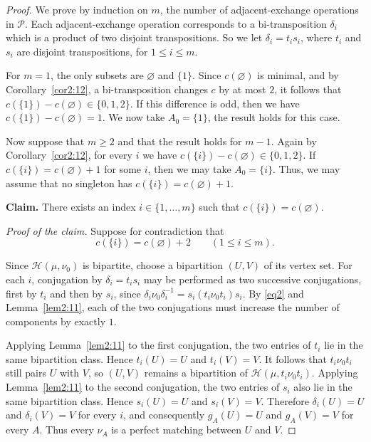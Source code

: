 \documentclass[12pt]{article}
\theoremstyle{definition}
\begin{document}
\begin{proof}
We prove by induction on $m$, the number of adjacent-exchange operations in $\mathcal P$.
Each adjacent-exchange operation corresponds to
a bi-transposition $\delta_i$ which is a product of two disjoint transpositions.
So we let $\delta_i=t_is_i$, where $t_i$ and $s_i$ are disjoint transpositions, for $1\leq i\leq m$.


For $m=1$, the only subsets are $\varnothing$ and $\{1\}$. Since $c(\varnothing)$ is minimal, and by Corollary~\ref{cor2:12}, a bi-transposition changes $c$ by at most $2$, it follows that $c(\{1\})-c(\varnothing)\in\{0,1,2\}$. If this difference is odd, then we have $c(\{1\})-c(\varnothing)=1$. We now take $A_0=\{1\}$, the result holds for this case.

Now suppose that $m\geq2$ and that the result holds for $m-1.$
Again by
Corollary~\ref{cor2:12}, for every $i$ we have
$c(\{i\})-c(\varnothing)\in\{0,1,2\}$.
If $c(\{i\})=c(\varnothing)+1$ for some $i$, then we may take
$A_0=\{i\}$. Thus, we may assume that no singleton has $c(\{i\})=c(\varnothing)+1$.

\medskip
\noindent\textbf{Claim.}
There exists an index $i\in\{1,\ldots,m\}$ such that
$c(\{i\})=c(\varnothing)$.

\smallskip
\noindent\textit{Proof of the claim.}
Suppose for contradiction that
\begin{equation}
c(\{i\})=c(\varnothing)+2
\qquad (1\leq i\leq m).
\label{eq2}
\end{equation}

Since $\mathcal H(\mu,\nu_0)$ is bipartite, choose a bipartition
$(U,V)$ of its vertex set. For each $i$, conjugation by
$\delta_i=t_is_i$ may be performed as two successive conjugations,
first by $t_i$ and then by $s_i$, since
$\delta_i\nu_0\delta_i^{-1}=s_i(t_i\nu_0t_i)s_i$.
By \eqref{eq2} and
Lemma~\ref{lem2:11}, each of the two conjugations must
increase the number of components by exactly $1$.

Applying Lemma~\ref{lem2:11} to the first
conjugation, the two entries of $t_i$ lie in the same bipartition
class. Hence $t_i(U)=U$ and $t_i(V)=V$. It follows that
$t_i\nu_0t_i$ still pairs $U$ with $V$, so $(U,V)$ remains a
bipartition of $\mathcal H(\mu,t_i\nu_0t_i)$.
Applying Lemma~\ref{lem2:11} to the second
conjugation, the two entries of $s_i$ also lie in the same
bipartition class. Hence $s_i(U)=U$ and $s_i(V)=V$.
Therefore $\delta_i(U)=U$ and $\delta_i(V)=V$ for every $i$, and
consequently $g_A(U)=U$ and $g_A(V)=V$ for every $A$.
Thus every $\nu_A$ is a perfect matching between $U$ and $V$.


\end{proof}
\end{document}

